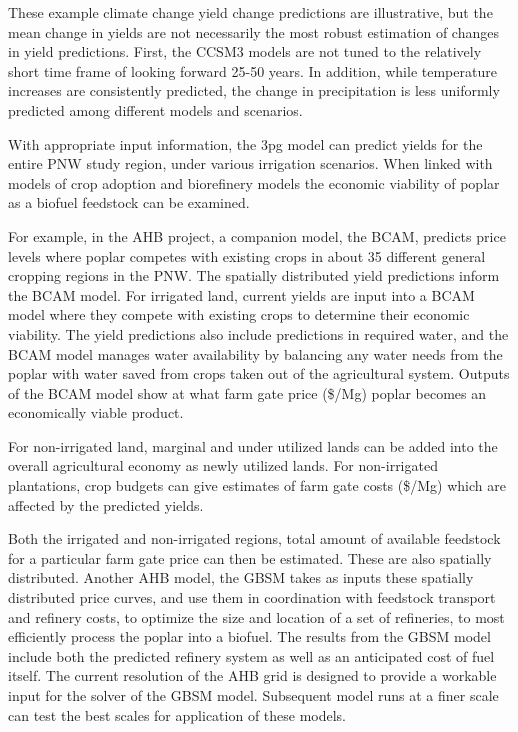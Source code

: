 \documentclass[preprint,12pt]{elsarticle}
\begin{document}
These example climate change yield change predictions are
illustrative, but the mean change in yields are not necessarily the
most robust estimation of changes in yield predictions.  First, the
\ac{CCSM3} models are not tuned to the relatively short time frame of
looking forward 25-50 years.  In addition, while temperature increases
are consistently predicted, the change in precipitation is less
uniformly predicted among different models and scenarios. 

With appropriate input information, the \ac{3pg} model can predict
yields for the entire \ac{PNW} study region, under various irrigation
scenarios.  When linked with models of crop adoption and biorefinery
models the economic viability of poplar as a biofuel feedstock can be
examined.
 
For example, in the \ac{AHB} project, a companion model, the
\acf{BCAM}, predicts price levels where poplar competes with existing
crops in about 35 different general cropping regions in the \ac{PNW}.
The spatially distributed yield predictions inform the \ac{BCAM}
model.  For irrigated land, current yields are input into a \ac{BCAM}
model where they compete with existing crops to determine their
economic viability.  The yield predictions also include predictions in
required water, and the \ac{BCAM} model manages water availability by
balancing any water needs from the poplar with water saved from crops
taken out of the agricultural system.  Outputs of the \ac{BCAM} model
show at what farm gate price (\$/Mg) poplar becomes an economically
viable product.
 
For non-irrigated land, marginal and under utilized lands can be added
into the overall agricultural economy as newly utilized lands.  For
non-irrigated plantations, crop budgets can give estimates of farm gate
costs (\$/Mg) which are affected by the predicted yields.

Both the irrigated and non-irrigated regions, total amount of available
feedstock for a particular farm gate price can then be estimated.
These are also spatially distributed.  Another \ac{AHB} model, the
\acf{GBSM} takes as inputs these spatially distributed price curves,
and use them in coordination with feedstock transport and refinery
costs, to optimize the size and location of a set of refineries, to
most efficiently process the poplar into a biofuel.  The results from
the \ac{GBSM} model include both the predicted refinery system as well
as an anticipated cost of fuel itself.  The current resolution of the
\ac{AHB} grid is designed to provide a workable input for the solver
of the \ac{GBSM} model.  Subsequent model runs at a finer scale can
test the best scales for application of these models.
\end{document}
